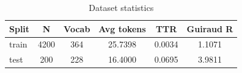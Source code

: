 \begin{table}[t]
\centering
\caption{Dataset statistics}
\label{tab:table1_dataset_statistics}
\begin{tabular}{lccccc}
\toprule
Split & N & Vocab & Avg tokens & TTR & Guiraud R \\
\midrule
train & 4200 & 364 & 25.7398 & 0.0034 & 1.1071 \\
test & 200 & 228 & 16.4000 & 0.0695 & 3.9811 \\
\bottomrule
\end{tabular}
\end{table}
